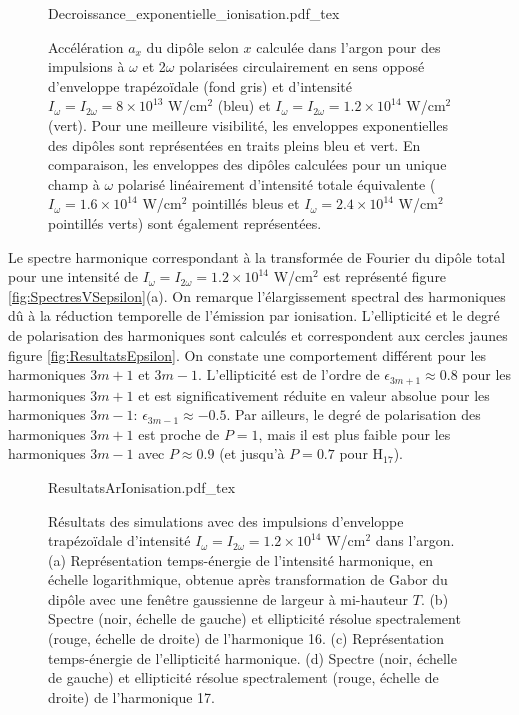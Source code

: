 \begin{figure}
\centering
\def\svgwidth{0.8\textwidth}
{Decroissance_exponentielle_ionisation.pdf_tex}
\caption{Accélération $a_x$ du dipôle selon $x$ calculée dans l'argon pour des impulsions à $\omega$ et 2$\omega$ polarisées circulairement en sens opposé d'enveloppe trapézoïdale (fond gris) et d'intensité $I_\omega = I_{2\omega} = 8 \times 10^{13}$ W/cm$^2$ (bleu) et $I_\omega = I_{2\omega} = 1.2 \times 10^{14}$ W/cm$^2$ (vert). Pour une meilleure visibilité, les enveloppes exponentielles des dipôles sont représentées en traits pleins bleu et vert. En comparaison, les enveloppes des dipôles calculées pour un unique champ à $\omega$ polarisé linéairement d'intensité totale équivalente ($I_\omega = 1.6 \times 10^{14}$ W/cm$^2$ pointillés bleus et $I_\omega = 2.4 \times 10^{14}$ W/cm$^2$ pointillés verts) sont également représentées.}
\label{fig:Decroissance_exponentielle_ionisation}
\end{figure}

Le spectre harmonique correspondant à la transformée de Fourier du dipôle total pour une intensité de $I_\omega = I_{2\omega} = 1.2 \times 10^{14}$ W/cm$^2$ est représenté figure \ref{fig:SpectresVSepsilon}(a). On remarque l'élargissement spectral des harmoniques dû à la réduction temporelle de l'émission par ionisation. L'ellipticité et le degré de polarisation des harmoniques sont calculés et correspondent aux cercles jaunes figure \ref{fig:ResultatsEpsilon}. On constate une comportement différent pour les harmoniques $3m+1$ et $3m-1$. L'ellipticité est de l'ordre de $\epsilon_{3m+1} \approx 0.8$ pour les harmoniques $3m+1$ et est significativement réduite en valeur absolue pour les harmoniques $3m-1$: $\epsilon_{3m-1} \approx -0.5$. Par ailleurs, le degré de polarisation des harmoniques $3m+1$ est proche de $P = 1$, mais il est plus faible pour les harmoniques $3m-1$ avec $P \approx 0.9$ (et jusqu'à $P = 0.7$ pour H$_{17}$).

\begin{figure}
\centering
\def\svgwidth{\textwidth}
{ResultatsArIonisation.pdf_tex}
\caption{Résultats des simulations avec des impulsions d'enveloppe trapézoïdale d'intensité $I_\omega = I_{2\omega} = 1.2 \times 10^{14}$ W/cm$^2$ dans l'argon. (a) Représentation temps-énergie de l'intensité harmonique, en échelle logarithmique, obtenue après transformation de Gabor du dipôle avec une fenêtre gaussienne de largeur à mi-hauteur $T$. (b) Spectre (noir, échelle de gauche) et ellipticité résolue spectralement (rouge, échelle de droite) de l'harmonique 16. (c) Représentation temps-énergie de l'ellipticité harmonique. (d) Spectre (noir, échelle de gauche) et ellipticité résolue spectralement (rouge, échelle de droite) de l'harmonique 17.}
\label{fig:ResultatsArIonisation}
\end{figure}

